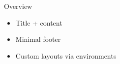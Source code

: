 \begin{SlideTitleContent}{Overview}
    \begin{itemize}
        \item Title + content
        \item Minimal footer
        \item Custom layouts via environments
    \end{itemize}
\end{SlideTitleContent}
